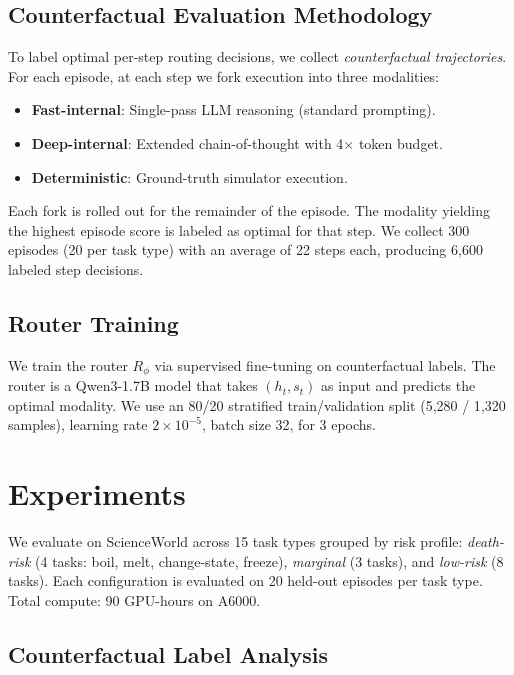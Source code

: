 \documentclass[11pt,a4paper]{article}
\begin{document}
\subsection{Counterfactual Evaluation Methodology}

To label optimal per-step routing decisions, we collect \emph{counterfactual trajectories}. For each episode, at each step we fork execution into three modalities:
\begin{itemize}
\item \textbf{Fast-internal}: Single-pass LLM reasoning (standard prompting).
\item \textbf{Deep-internal}: Extended chain-of-thought with 4$\times$ token budget.
\item \textbf{Deterministic}: Ground-truth simulator execution.
\end{itemize}

Each fork is rolled out for the remainder of the episode. The modality yielding the highest episode score is labeled as optimal for that step. We collect 300 episodes (20 per task type) with an average of 22 steps each, producing 6{,}600 labeled step decisions.

\subsection{Router Training}

We train the router $R_\phi$ via supervised fine-tuning on counterfactual labels. The router is a Qwen3-1.7B model that takes $(h_t, s_t)$ as input and predicts the optimal modality. We use an 80/20 stratified train/validation split (5{,}280 / 1{,}320 samples), learning rate $2 \times 10^{-5}$, batch size 32, for 3 epochs.

\section{Experiments}

We evaluate on ScienceWorld across 15 task types grouped by risk profile: \emph{death-risk} (4 tasks: boil, melt, change-state, freeze), \emph{marginal} (3 tasks), and \emph{low-risk} (8 tasks). Each configuration is evaluated on 20 held-out episodes per task type. Total compute: 90 GPU-hours on A6000.

\subsection{Counterfactual Label Analysis}
\end{document}
